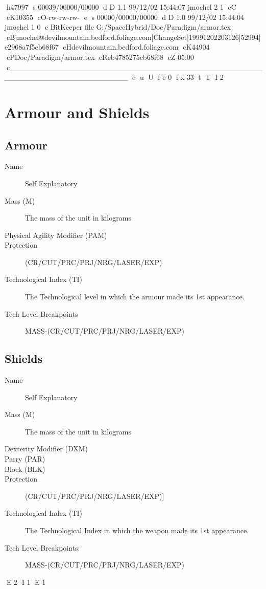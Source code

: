 h47997
s 00039/00000/00000
d D 1.1 99/12/02 15:44:07 jmochel 2 1
cC
cK10355
cO-rw-rw-rw-
e
s 00000/00000/00000
d D 1.0 99/12/02 15:44:04 jmochel 1 0
c BitKeeper file G:/SpaceHybrid/Doc/Paradigm/armor.tex
cBjmochel@devilmountain.bedford.foliage.com|ChangeSet|19991202203126|52994|e2968a7f5cb68f67
cHdevilmountain.bedford.foliage.com
cK44904
cPDoc/Paradigm/armor.tex
cReb4785275cb68f68
cZ-05:00
c______________________________________________________________________
e
u
U
f e 0
f x 33
t
T
I 2
\chapter{Armour and Shields}

\section{Armour}

\begin{description}
	\item[Name]
	Self Explanatory
	\item[Mass (M)]
	The mass of the unit in kilograms
	\item[Physical Agility Modifier (PAM)]
	\item[Protection]
	(CR/CUT/PRC/PRJ/NRG/LASER/EXP)
	\item[Technological Index (TI)]
	The Technological level in which the armour made its 1st appearance.
	\item[Tech Level Breakpoints]
	MASS-(CR/CUT/PRC/PRJ/NRG/LASER/EXP)
\end{description}

\clearpage

\section{Shields}

\begin{description}
	\item[Name]
	Self Explanatory
	\item[Mass (M)]
	The mass of the unit in kilograms
	\item[Dexterity Modifier (DXM)]
	\item[Parry (PAR)]
	\item[Block (BLK)]
	\item[Protection]
	(CR/CUT/PRC/PRJ/NRG/LASER/EXP)]
	\item[Technological Index (TI)]
	The Technological Index in which the weapon made its 1st appearance.
	\item[Tech Level Breakpoints:]
	MASS-(CR/CUT/PRC/PRJ/NRG/LASER/EXP)
\end{description}


E 2
I 1
E 1
